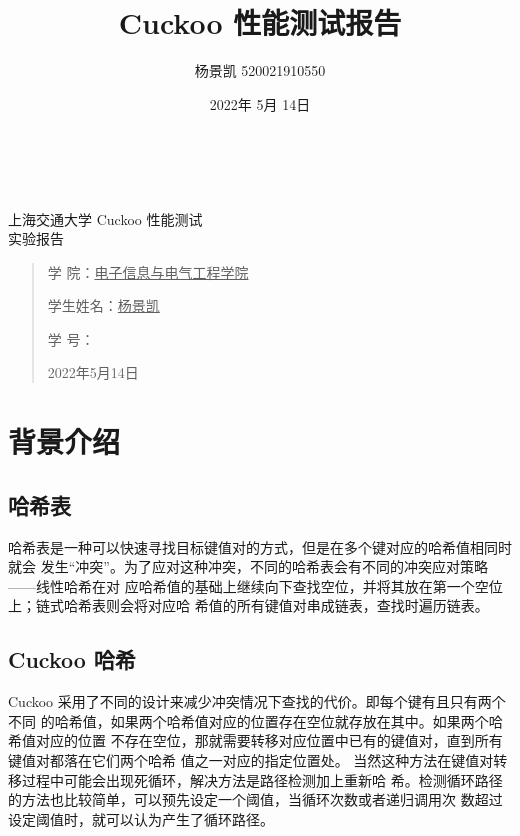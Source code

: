 \documentclass[UTF8]{ctexart}
\title{Cuckoo 性能测试报告}
\author{杨景凯 520021910550}
\date{2022年 5月 14日}
\begin{document}
\begin{center}
    \quad \\
    \quad \\
    \kaishu \fontsize{45}{17} 上\quad 海\quad 交\quad 通\quad 大\quad 学
    \vskip 3.5cm
    \heiti {} Cuckoo 性能测试\\
    实验报告
\end{center}
\vskip 3.5cm
\begin{quotation}
    \songti \fontsize{30}{30}
    \doublespacing
    \par\setlength\parindent{12em}
    \quad 
\begin{center}
    学\hspace{0.61cm} 院：\underline{电子信息与电气工程学院}

    学生姓名：\underline{\qquad    \quad \quad 杨景凯    \quad  \quad\qquad }

    学\hspace{0.61cm} 号：\underline{\quad \quad{}\quad\quad}
\end{center}
    \centering
    2022年5月14日
\end{quotation}

\clearpage
\tableofcontents

\clearpage
\section{背景介绍\cite{refpdf1}}
\subsection{哈希表}
哈希表是一种可以快速寻找目标键值对的方式，但是在多个键对应的哈希值相同时就会
发生“冲突”。为了应对这种冲突，不同的哈希表会有不同的冲突应对策略——线性哈希在对
应哈希值的基础上继续向下查找空位，并将其放在第一个空位上；链式哈希表则会将对应哈
希值的所有键值对串成链表，查找时遍历链表。
\subsection{Cuckoo 哈希}
Cuckoo 采用了不同的设计来减少冲突情况下查找的代价。即每个键有且只有两个不同
的哈希值，如果两个哈希值对应的位置存在空位就存放在其中。如果两个哈希值对应的位置
不存在空位，那就需要转移对应位置中已有的键值对，直到所有键值对都落在它们两个哈希
值之一对应的指定位置处。
当然这种方法在键值对转移过程中可能会出现死循环，解决方法是路径检测加上重新哈
希。检测循环路径的方法也比较简单，可以预先设定一个阈值，当循环次数或者递归调用次
数超过设定阈值时，就可以认为产生了循环路径。
\end{document}
